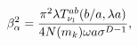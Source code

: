 \begin{equation}
\beta _{\alpha }^{2}=\frac{\pi ^{2}\lambda T_{\nu _{l}}^{ab}(b/a,\lambda a)}{%
4N(m_{k})\omega a\sigma ^{D-1}},  \label{normcoef}
\end{equation}

